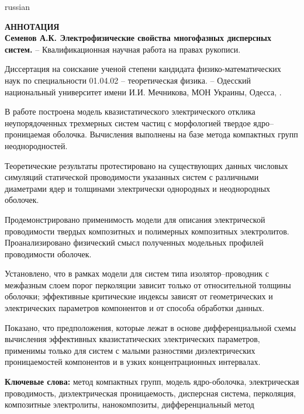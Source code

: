 \documentclass[twoside,a4paper,14pt]{vakaref}
\begin{document}
\begin{otherlanguage*}{russian}
\begin{center}
	{\normalfont \textbf{
			АННОТАЦИЯ\\
			Семенов А.К. Электрофизические свойства многофазных дисперсных систем.} -- Квалификационная научная работа на правах рукописи.}
\end{center}
\vskip 5pt
	
Диссертация на соискание ученой степени кандидата физико-матема\-тических наук по специальности 01.04.02 -- теоретическая физика. -- Одесский национальный университет имени И.И. Мечникова, МОН Украины, Одесса, \the\year.

\vskip 5pt

В работе построена модель квазистатического электрического отклика неупорядоченных трехмерных систем частиц с морфологией твердое ядро--проницаемая оболочка. Вычисления выполнены на базе метода компактных групп неоднородностей.

Теоретические результаты протестировано на существующих данных числовых симуляций статической проводимости указанных систем с различными диаметрами ядер и толщинами электрически однородных и неоднородных оболочек.

Продемонстрировано применимость модели для описания электрической проводимости твердых композитных и полимерных композитных электролитов. Проанализировано физический смысл полученных модельных профилей проводимости оболочек.

Установлено, что в рамках модели для систем типа изолятор--проводник с межфазным слоем порог перколяции зависит только от относительной толщины оболочки; эффективные критические индексы зависят от геометрических и электрических параметров компонентов и от способа обработки данных.

Показано, что предположения, которые лежат в основе дифференциальной схемы вычисления эффективных квазистатических электрических параметров, применимы только для систем с малыми разностями диэлектрических проницаемостей компонентов и в узких концентрационных интервалах.

\vskip 10pt
\textbf{Ключевые слова:} метод компактных групп, модель ядро-оболочка, электрическая проводимость, диэлектрическая проницаемость, дисперсная система, перколяция, композитные электролиты, нанокомпозиты, дифференциальный метод
	
\end{otherlanguage*}
\end{document}

